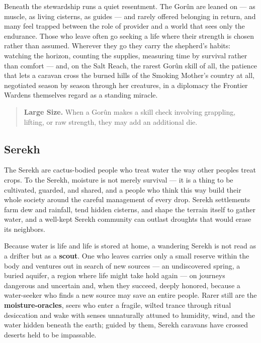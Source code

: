 Beneath the stewardship runs a quiet resentment. The Gorûn are leaned on --- as muscle, as living cisterns, as guides --- and rarely offered belonging in return, and many feel trapped between the role of provider and a world that sees only the endurance. Those who leave often go seeking a life where their strength is chosen rather than assumed. Wherever they go they carry the shepherd's habits: watching the horizon, counting the supplies, measuring time by survival rather than comfort --- and, on the Salt Reach, the rarest Gorûn skill of all, the patience that lets a caravan cross the burned hills of the Smoking Mother's country at all, negotiated season by season through her creatures, in a diplomacy the Frontier Wardens themselves regard as a standing miracle.

\begin{quote}
\textbf{Large Size.} When a Gorûn makes a skill check involving grappling, lifting, or raw strength, they may add an additional die.
\end{quote}

\subsection{Serekh}

The Serekh are cactus-bodied people who treat water the way other peoples treat crops. To the Serekh, moisture is not merely survival --- it is a thing to be cultivated, guarded, and shared, and a people who think this way build their whole society around the careful management of every drop. Serekh settlements farm dew and rainfall, tend hidden cisterns, and shape the terrain itself to gather water, and a well-kept Serekh community can outlast droughts that would erase its neighbors.

Because water is life and life is stored at home, a wandering Serekh is not read as a drifter but as a \textbf{scout}. One who leaves carries only a small reserve within the body and ventures out in search of new sources --- an undiscovered spring, a buried aquifer, a region where life might take hold again --- on journeys dangerous and uncertain and, when they succeed, deeply honored, because a water-seeker who finds a new source may save an entire people. Rarer still are the \textbf{moisture-oracles}, seers who enter a fragile, wilted trance through ritual desiccation and wake with senses unnaturally attuned to humidity, wind, and the water hidden beneath the earth; guided by them, Serekh caravans have crossed deserts held to be impassable.

